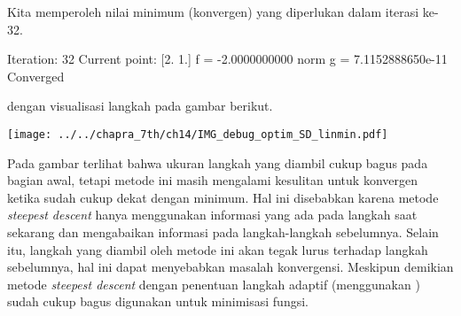 Kita memperoleh nilai minimum (konvergen) yang diperlukan dalam iterasi ke-32.
\begin{textcode}
Iteration:  32
Current point:  [2. 1.]
f      =      -2.0000000000
norm g =   7.1152888650e-11
Converged
\end{textcode}
dengan visualisasi langkah pada gambar berikut.

{\centering
\texttt{[image: ../../chapra\_7th/ch14/IMG\_debug\_optim\_SD\_linmin.pdf]}
\par}

Pada gambar terlihat bahwa ukuran langkah yang diambil cukup bagus pada bagian awal,
tetapi metode ini masih mengalami kesulitan untuk konvergen ketika sudah cukup dekat
dengan minimum. Hal ini disebabkan karena metode \textit{steepest descent} hanya
menggunakan informasi yang ada pada langkah saat sekarang dan mengabaikan
informasi pada langkah-langkah sebelumnya. Selain itu, langkah yang diambil oleh metode
ini akan tegak lurus terhadap langkah sebelumnya, hal ini dapat menyebabkan masalah
konvergensi. Meskipun demikian metode \textit{steepest descent} dengan penentuan
langkah adaptif (menggunakan ) sudah cukup bagus digunakan
untuk minimisasi fungsi.
